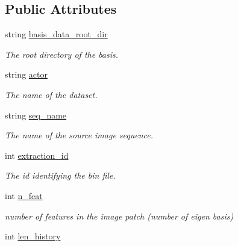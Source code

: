\subsection*{Public Attributes}
\begin{DoxyCompactItemize}
\item 
\hypertarget{structPCAParams_aa0acd979d4636cad696f932c705109e3}{string \hyperlink{structPCAParams_aa0acd979d4636cad696f932c705109e3}{basis\-\_\-data\-\_\-root\-\_\-dir}}\label{structPCAParams_aa0acd979d4636cad696f932c705109e3}

\begin{DoxyCompactList}\small\item\em The root directory of the basis. \end{DoxyCompactList}\item 
\hypertarget{structPCAParams_ad1d49df67adfb66f5e51cd6f8d430658}{string \hyperlink{structPCAParams_ad1d49df67adfb66f5e51cd6f8d430658}{actor}}\label{structPCAParams_ad1d49df67adfb66f5e51cd6f8d430658}

\begin{DoxyCompactList}\small\item\em The name of the dataset. \end{DoxyCompactList}\item 
\hypertarget{structPCAParams_aec0a63e4d0b31b53844999e0ab445894}{string \hyperlink{structPCAParams_aec0a63e4d0b31b53844999e0ab445894}{seq\-\_\-name}}\label{structPCAParams_aec0a63e4d0b31b53844999e0ab445894}

\begin{DoxyCompactList}\small\item\em The name of the source image sequence. \end{DoxyCompactList}\item 
\hypertarget{structPCAParams_a747eee6c2c8fb5936ceed76cbd3708d1}{int \hyperlink{structPCAParams_a747eee6c2c8fb5936ceed76cbd3708d1}{extraction\-\_\-id}}\label{structPCAParams_a747eee6c2c8fb5936ceed76cbd3708d1}

\begin{DoxyCompactList}\small\item\em The id identifying the bin file. \end{DoxyCompactList}\item 
\hypertarget{structPCAParams_a407e786b6ed9d47b930c6a1f817514f8}{int \hyperlink{structPCAParams_a407e786b6ed9d47b930c6a1f817514f8}{n\-\_\-feat}}\label{structPCAParams_a407e786b6ed9d47b930c6a1f817514f8}

\begin{DoxyCompactList}\small\item\em number of features in the image patch (number of eigen basis) \end{DoxyCompactList}\item 
\hypertarget{structPCAParams_a17b133133e534514d088b902d2ed31f4}{int \hyperlink{structPCAParams_a17b133133e534514d088b902d2ed31f4}{len\-\_\-history}}\label{structPCAParams_a17b133133e534514d088b902d2ed31f4}


\end{DoxyCompactItemize}
